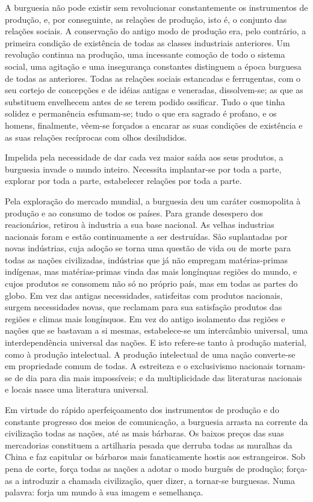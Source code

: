 A burguesia não pode existir sem revolucionar constantemente os
instrumentos de produção, e, por conseguinte, as relações de produção,
isto é, o conjunto das relações sociais. A conservação do antigo modo
de produção era, pelo contrário, a primeira condição de existência de
todas as classes industriais anteriores. Um revolução continua na
produção, uma incessante comoção de todo o sistema social, uma
agitação e uma insegurança constantes distinguem a época burguesa de
todas as anteriores. Todas as relações sociais estancadas e
ferrugentas, com o seu cortejo de concepções e de idéias antigas e
veneradas, dissolvem-se; as que as substituem envelhecem antes de se
terem podido ossificar. Tudo o que tinha solidez e permanência
esfumam-se; tudo o que era sagrado é profano, e os homens, finalmente,
vêem-se forçados a encarar as suas condições de existência e as suas
relações recíprocas com olhos desiludidos.

Impelida pela necessidade de dar cada vez maior saída aos seus
produtos, a burguesia invade o mundo inteiro. Necessita implantar-se
por toda a parte, explorar por toda a parte, estabelecer relações por
toda a parte.

Pela exploração do mercado mundial, a burguesia deu um caráter
cosmopolita à produção e ao consumo de todos os países. Para grande
desespero dos reacionários, retirou à industria a sua base
nacional. As velhas industrias nacionais foram e estão continuamente a
ser destruídas. São suplantadas por novas indústrias, cuja adoção se
torna uma questão de vida ou de morte para todas as nações
civilizadas, indústrias que já não empregam matérias-primas indígenas,
mas matérias-primas vinda das mais longínquas regiões do mundo, e
cujos produtos se consomem não só no próprio país, mas em todas as
partes do globo. Em vez das antigas necessidades, satisfeitas com
produtos nacionais, surgem necessidades novas, que reclamam para sua
satisfação produtos das regiões e climas mais longínquos. Em vez do
antigo isolamento das regiões e nações que se bastavam a si mesmas,
estabelece-se um intercâmbio universal, uma interdependência universal
das nações. E isto refere-se tanto à produção material, como à
produção intelectual. A produção intelectual de uma nação converte-se
em propriedade comum de todas. A estreiteza e o exclusivismo nacionais
tornam-se de dia para dia mais impossíveis; e da multiplicidade das
literaturas nacionais e locais nasce uma literatura universal.

Em virtude do rápido aperfeiçoamento dos instrumentos de produção e do
constante progresso dos meios de comunicação, a burguesia arrasta na
corrente da civilização todas as nações, até as mais bárbaras. Os
baixos preços das suas mercadorias constituem a artilharia pesada que
derruba todas as muralhas da China e faz capitular os bárbaros mais
fanaticamente hostis aos estrangeiros. Sob pena de corte, força todas
as nações a adotar o modo burguês de produção; força-as a introduzir a
chamada civilização, quer dizer, a tornar-se burguesas. Numa palavra:
forja um mundo à sua imagem e semelhança.

